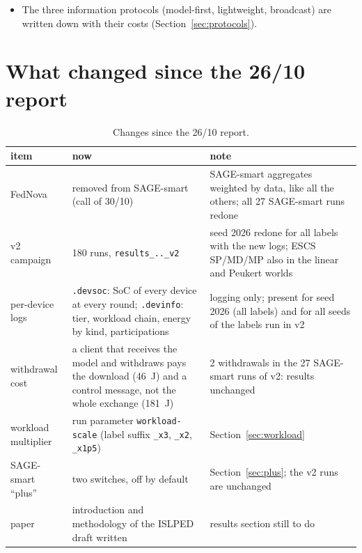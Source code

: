 \documentclass[11pt,a4paper]{article}
\begin{document}
\begin{itemize}
        of the other apps multiplied by 1.5, 2 and 3, the first version of
        SAGE-smart showed no gain from negotiation and SoC estimate. Diagnosis:
        a busy client accepted and then missed the deadline. In a second version
        (``plus'') the client also refuses when it cannot meet the deadline, and
        the estimate uses the mean reported load. Plus is better at every load
        ($\times3$: 38.9\,\% against 28.6\,\%, 11\,\% less energy, 59 depleted
        devices against 78), and now the negotiation clearly counts. \textbf{For
        now it seems to work, but it is one seed}, and it has a side effect:
        slow phones with large datasets are never selected. A fix is proposed
        and still has to be tested.
  \item The three information protocols (model-first, lightweight, broadcast)
        are written down with their costs (Section~\ref{sec:protocols}).
\end{itemize}

\section{What changed since the 26/10 report}

\begin{table}[H]
\centering
\small
\caption{Changes since the 26/10 report.}
\label{tab:changes}
\begin{tabular}{p{3.4cm}p{5.6cm}p{6.0cm}}
\toprule
item & now & note \\
\midrule
FedNova & removed from SAGE-smart (call of 30/10) & SAGE-smart aggregates weighted by data, like all the others; all 27 SAGE-smart runs redone \\
v2 campaign & 180 runs, \texttt{results\_..\_v2} & seed 2026 redone for all labels with the new logs; ESCS SP/MD/MP also in the linear and Peukert worlds \\
per-device logs & \texttt{.devsoc}: SoC of every device at every round; \texttt{.devinfo}: tier, workload chain, energy by kind, participations & logging only; present for seed 2026 (all labels) and for all seeds of the labels run in v2 \\
withdrawal cost & a client that receives the model and withdraws pays the download (46~J) and a control message, not the whole exchange (181~J) & 2 withdrawals in the 27 SAGE-smart runs of v2: results unchanged \\
workload multiplier & run parameter \texttt{workload-scale} (label suffix \texttt{\_x3}, \texttt{\_x2}, \texttt{\_x1p5}) & Section~\ref{sec:workload} \\
SAGE-smart ``plus'' & two switches, off by default & Section~\ref{sec:plus}; the v2 runs are unchanged \\
paper & introduction and methodology of the ISLPED draft written & results section still to do \\
\bottomrule
\end{tabular}
\end{table}
\end{document}
